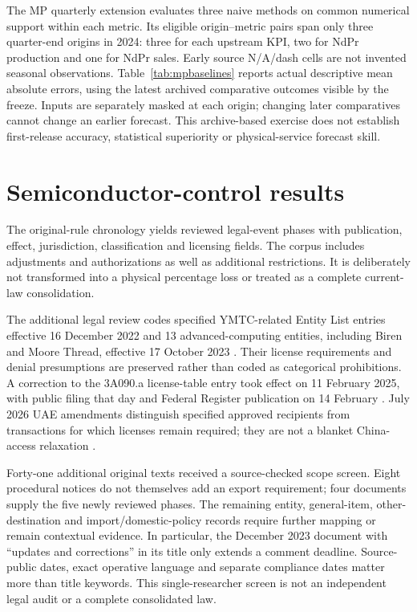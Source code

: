 \documentclass[11pt]{article}
\begin{document}
The MP quarterly extension evaluates three naive methods on common numerical support within each metric. Its \MPBaselinePairs{} eligible origin--metric pairs span only three quarter-end origins in 2024: three for each upstream KPI, two for NdPr production and one for NdPr sales. Early source N/A/dash cells are not invented seasonal observations. Table~\ref{tab:mpbaselines} reports actual descriptive mean absolute errors, using the latest archived comparative outcomes visible by the freeze. Inputs are separately masked at each origin; changing later comparatives cannot change an earlier forecast. This archive-based exercise does not establish first-release accuracy, statistical superiority or physical-service forecast skill.
\begin{table}[htbp]\centering

\caption{MP quarterly naive-baseline MAE in each KPI's native metric tonnes. Counts are one to three dependent origins per metric; methods share the same within-metric support. These are descriptive comparisons, not a hypothesis test or a system-service evaluation.}\label{tab:mpbaselines}
\end{table}

\section{Semiconductor-control results}
The original-rule chronology yields \LegalRows{} reviewed legal-event phases with publication, effect, jurisdiction, classification and licensing fields. The corpus includes adjustments and authorizations as well as additional restrictions. It is deliberately not transformed into a physical percentage loss or treated as a complete current-law consolidation.

The additional legal review codes specified YMTC-related Entity List entries effective 16 December 2022 and 13 advanced-computing entities, including Biren and Moore Thread, effective 17 October 2023 \citep{BIS2022Entity,BIS2023Entity}. Their license requirements and denial presumptions are preserved rather than coded as categorical prohibitions. A correction to the 3A090.a license-table entry took effect on 11 February 2025, with public filing that day and Federal Register publication on 14 February \citep{BIS2025Correction}. July 2026 UAE amendments distinguish specified approved recipients from transactions for which licenses remain required; they are not a blanket China-access relaxation \citep{BIS2026UAE}.

Forty-one additional original texts received a source-checked scope screen. Eight procedural notices do not themselves add an export requirement; four documents supply the five newly reviewed phases. The remaining entity, general-item, other-destination and import/domestic-policy records require further mapping or remain contextual evidence. In particular, the December 2023 document with ``updates and corrections'' in its title only extends a comment deadline. Source-public dates, exact operative language and separate compliance dates matter more than title keywords. This single-researcher screen is not an independent legal audit or a complete consolidated law.
\end{document}
